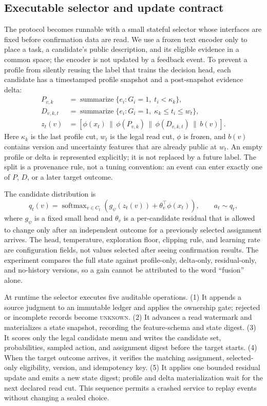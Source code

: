 \documentclass[sigconf,anonymous]{aamas}
\newcommand{\unknown}{\textsc{unknown}}
\begin{document}
\subsection{Executable selector and update contract}
The protocol becomes runnable with a small stateful selector whose interfaces are fixed before confirmation data are read. We use a frozen text encoder only to place a task, a candidate's public description, and its eligible evidence in a common space; the encoder is not updated by a feedback event. To prevent a profile from silently reusing the label that trains the decision head, each candidate has a timestamped profile snapshot and a post-snapshot evidence delta:
\begin{align}
 P_{v,k}&=\operatorname{summarize}\{e_i:G_i=1,\;t_i<\kappa_k\},\\
 D_{v,k,t}&=\operatorname{summarize}\{e_i:G_i=1,\;\kappa_k\leq t_i\leq w_t\},\\
 z_t(v)&=[\phi(x_t)\,\|\,\phi(P_{v,k})\,\|\,\phi(D_{v,k,t})\,\|\,b(v)] .
 \label{eq:selector-state}
\end{align}
Here $\kappa_k$ is the last profile cut, $w_t$ is the legal read cut, $\phi$ is frozen, and $b(v)$ contains version and uncertainty features that are already public at $w_t$. An empty profile or delta is represented explicitly; it is not replaced by a future label. The split is a provenance rule, not a tuning convention: an event can enter exactly one of $P$, $D$, or a later target outcome.

The candidate distribution is
\begin{equation}
 q_t(v)=\operatorname{softmax}_{v\in C_t}\left(g_\psi(z_t(v))+\theta_v^\top\phi(x_t)\right),
 \qquad a_t\sim q_t,
 \label{eq:selector}
\end{equation}
where $g_\psi$ is a fixed small head and $\theta_v$ is a per-candidate residual that is allowed to change only after an independent outcome for a previously selected assignment arrives. The head, temperature, exploration floor, clipping rule, and learning rate are configuration fields, not values selected after seeing confirmation results. The experiment compares the full state against profile-only, delta-only, residual-only, and no-history versions, so a gain cannot be attributed to the word ``fusion'' alone.

At runtime the selector executes five auditable operations. (1) It appends a source judgment to an immutable ledger and applies the ownership gate; rejected or incomplete records become \unknown{}. (2) It advances a read watermark and materializes a state snapshot, recording the feature-schema and state digest. (3) It scores only the legal candidate menu and writes the candidate set, probabilities, sampled action, and assignment digest before the target starts. (4) When the target outcome arrives, it verifies the matching assignment, selected-only eligibility, version, and idempotency key. (5) It applies one bounded residual update and emits a new state digest; profile and delta materialization wait for the next declared read cut. This sequence permits a crashed service to replay events without changing a sealed choice.
\end{document}
